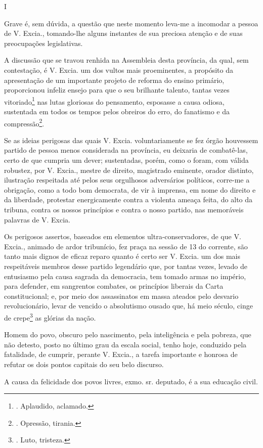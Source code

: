 I

Grave é, sem dúvida, a questão que neste momento leva-me a incomodar a
pessoa de V. Excia., tomando-lhe alguns instantes de sua preciosa
atenção e de suas preocupações legislativas.

A discussão que se travou renhida na Assembleia desta província, da
qual, sem contestação, é V. Excia. um dos vultos mais proeminentes, a
propósito da apresentação de um importante projeto de reforma do ensino
primário, proporcionou infeliz ensejo para que o seu brilhante talento,
tantas vezes vitoriado\footnote{. Aplaudido, aclamado.} nas lutas
gloriosas do pensamento, esposasse a causa odiosa, sustentada em todos
os tempos pelos obreiros do erro, do fanatismo e da
compressão\footnote{. Opressão, tirania.}.

Se as ideias perigosas das quais V. Excia. voluntariamente se fez órgão
houvessem partido de pessoa menos considerada na província, eu deixaria
de combatê-las, certo de que cumpria um dever; sustentadas, porém, como
o foram, com válida robustez, por V. Excia., mestre de direito,
magistrado eminente, orador distinto, ilustração respeitada até pelos
seus orgulhosos adversários políticos, corre-me a obrigação, como a todo
bom democrata, de vir à imprensa, em nome do direito e da liberdade,
protestar energicamente contra a violenta ameaça feita, do alto da
tribuna, contra os nossos princípios e contra o nosso partido, nas
memoráveis palavras de V. Excia.

Os perigosos assertos, baseados em elementos ultra-conservadores, de que
V. Excia., animado de ardor tribunício, fez praça na sessão de 13 do
corrente, são tanto mais dignos de eficaz reparo quanto é certo ser V.
Excia. um dos mais respeitáveis membros desse partido legendário que,
por tantas vezes, levado de entusiasmo pela causa sagrada da democracia,
tem tomado armas no império, para defender, em sangrentos combates, os
princípios liberais da Carta constitucional; e, por meio dos
assassinatos em massa ateados pelo desvario revolucionário, levar de
vencido o absolutismo ousado que, há meio século, cinge de
crepe\footnote{. Luto, tristeza.} as glórias da nação.

Homem do povo, obscuro pelo nascimento, pela inteligência e pela
pobreza, que não detesto, posto no último grau da escala social, tenho
hoje, conduzido pela fatalidade, de cumprir, perante V. Excia., a tarefa
importante e honrosa de refutar os dois pontos capitais do seu belo
discurso.

A causa da felicidade dos povos livres, exmo. sr. deputado, é a sua
educação civil.

